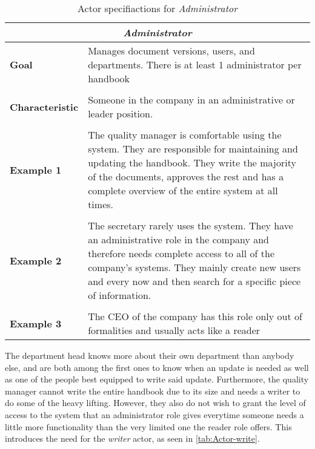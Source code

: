 \begin{table}[H]
	\begin{tabular}{l m{11.3cm}}
		\hline
		\multicolumn{2}{c}{\textbf{\textit{Administrator}}}\\
		\hline
		
		\textbf{Goal} &  Manages document versions, users, and departments. There is at least 1 administrator per handbook\\
		 &  \\
		 
		\textbf{Characteristic} & Someone in the company in an administrative or leader position.\\
		&  \\
		
		\textbf{Example 1}
		& The quality manager is comfortable using the system. 
		They are responsible for maintaining and updating the handbook.
		They write the majority of the documents, approves the rest and has a complete overview of the entire system at all times. \\
		&  \\
		
		\textbf{Example 2}
		& The secretary rarely uses the system.
		They have an administrative role in the company and therefore needs complete access to all of the company's systems.
		They mainly create new users and every now and then search for a specific piece of information.\\
		&  \\
		
		\textbf{Example 3}
		& The CEO of the company has this role only out of formalities and usually acts like a reader\\
		
		\hline
	\end{tabular}
\caption{Actor specifiactions for \textit{Administrator}}\label{tab:Actor-admin}
\end{table}

The department head knows more about their own department than anybody else, and are both among the first ones to know when an update is needed as well as one of the people best equipped to write said update.
Furthermore, the quality manager cannot write the entire handbook due to its size and needs a writer to do some of the heavy lifting.
However, they also do not wish to grant the level of access to the system that an administrator role gives everytime someone needs a little more functionality than the very limited one the reader role offers.
This introduces the need for the \textit{writer} actor, as seen in \cref{tab:Actor-write}.

